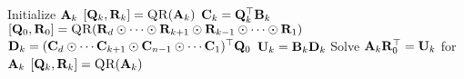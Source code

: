
\begin{algorithmic}[1]
        \State Initialize $\mathbf{A}_k$
        \State $[\mat{Q}_k,\mat{R}_k] = \Call{QR}{\mat{A}_k}$ 
        \State $\mathbf{C}_k = \mathbf{Q}_k^\top\mathbf{B}_k$  \label{l:EXP-K-Apply} 
      \EndFor
          \State $[\mat{Q}_0,\mat{R}_0] = \Call{QR}{\mat{R}_d \odot \cdots \odot \mat{R}_{k+1} \odot \mat{R}_{k-1} \odot \cdots \odot \mat{R}_1}$ 
          \State $\mathbf{D}_k = (\mathbf{C}_d \odot \cdots \mathbf{C}_{k+1} \odot \mathbf{C}_{n-1} \odot \cdots \mathbf{C}_1)^\top\mathbf{Q}_0$ 
          \State $\mathbf{U}_k = \mathbf{B}_k\mathbf{D}_k$  \label{l:EXP-mttkrp}
          \State Solve $\mathbf{A}_k\mathbf{R}_0^\top = \mathbf{U}_k$ for $\mathbf{A}_k$ 
          \State $[\mat{Q}_k,\mat{R}_k] = \Call{QR}{\mat{A}_k}$      
        \EndFor
      \EndWhile
    \EndFunction
  \end{algorithmic}